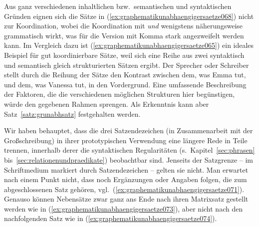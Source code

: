 Aus ganz verschiedenen inhaltlichen bzw.\ semantischen und syntaktischen Gründen eignen sich die Sätze in (\ref{ex:graphematikunabhaengigersaetze068}) nicht zur Koordination, wobei die Koordination mit \textit{und} wenigstens näherungsweise grammatisch wirkt, was für die Version mit Komma stark angezweifelt werden kann.
Im Vergleich dazu ist (\ref{ex:graphematikunabhaengigersaetze065}) ein ideales Beispiel für gut koordinierbare Sätze, weil sich eine Reihe aus zwei syntaktisch und semantisch gleich strukturierten Sätzen ergibt.
Der Sprecher oder Schreiber stellt durch die Reihung der Sätze den Kontrast zwischen dem, was Emma tut, und dem, was Vanessa tut, in den Vordergrund.
Eine umfassende Beschreibung der Faktoren, die die verschiedenen möglichen Strukturen hier begünstigen, würde den gegebenen Rahmen sprengen.
Als Erkenntnis kann aber Satz~\ref{satz:grunabhsatz} festgehalten werden.


Wir haben behauptet, dass die drei Satzendezeichen (in Zusammenarbeit mit der Großschreibung) in ihrer prototypischen Verwendung eine längere Rede in Teile trennen, innerhalb derer die syntaktischen Regularitäten (s.\ Kapitel~\ref{sec:phrasen} bis~\ref{sec:relationenundpraedikate}) beobachtbar sind.
Jenseits der Satzgrenze -- im Schriftmedium markiert durch Satzendezeichen -- gelten sie nicht.
Man erwartet \zB nach einem Punkt nicht, dass noch Ergänzungen oder Angaben folgen, die zum abgeschlossenen Satz gehören, vgl.\ (\ref{ex:graphematikunabhaengigersaetze071}).
Genauso können Nebensätze zwar ganz ans Ende nach ihren Matrixsatz gestellt werden wie in (\ref{ex:graphematikunabhaengigersaetze073}), aber nicht nach den nachfolgenden Satz wie in (\ref{ex:graphematikunabhaengigersaetze074}).

\begin{exe}
  \ex\label{ex:graphematikunabhaengigersaetze072}
  \begin{xlist}
  \end{xlist}
\end{exe}


